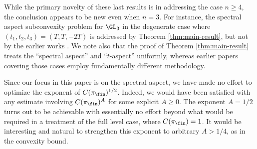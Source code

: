 \begin{remark}
  While the primary novelty of these last results is in addressing the case $n \geq 4$, the conclusion appears to be new even when $n=3$.  For instance, the spectral aspect subconvexity problem for $\GL_3$ in the degenerate case where $(t_1,t_2,t_3) = (T, T, - 2 T)$ is addressed by Theorem \ref{thm:main-result}, but not by the earlier works \cite{MR4203038, MR4039487, 2020arXiv200607819K}.  We note also that the proof of Theorem \ref{thm:main-result} treats the ``spectral aspect'' and ``$t$-aspect'' uniformly, whereas earlier papers covering those cases \cite{MR3369905, MR4270876, MR4203038, MR4039487, 2020arXiv200607819K} employ fundamentally different methodology.
\end{remark}

\begin{remark}
  Since our focus in this paper is on the spectral aspect, we have made no effort to optimize the exponent of $C(\pi_{\fin})^{1/2}$.  Indeed, we would have been satisfied with any estimate involving $C(\pi_{\fin})^A$ for some explicit $A \geq 0$.  The exponent $A = 1/2$ turns out to be achievable with essentially no effort beyond what would be required in a treatment of the full level case, where $C(\pi_{\fin}) = 1$.  It would be interesting and natural to strengthen this exponent to arbitrary $A > 1/4$, as in the convexity bound.
\end{remark}

